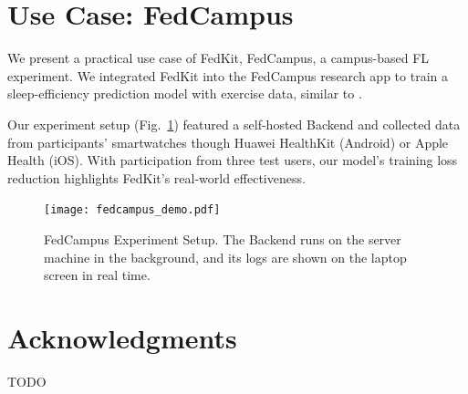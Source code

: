 \documentclass[letterpaper]{article} %
\begin{document}
\section{Use Case: FedCampus}

We present a practical use case of FedKit, FedCampus,
a campus-based FL experiment.
We integrated FedKit into the FedCampus research app to
train a sleep-efficiency prediction model with exercise data,
similar to \cite{khoa2022fedmcrnn}.

Our experiment setup (Fig.~\ref{fig:fedcampus}) featured a self-hosted Backend
and collected data from participants' smartwatches
though Huawei HealthKit (Android) or Apple Health (iOS).
With participation from three test users,
our model's training loss reduction highlights
FedKit's real-world effectiveness.

\begin{figure}
    \centering
    \texttt{[image: fedcampus\_demo.pdf]}
    \caption{FedCampus Experiment Setup.
        The Backend runs on the server machine in the background,
        and its logs are shown on the laptop screen in real time.}
    \label{fig:fedcampus}
\end{figure}

\appendix

\section*{Acknowledgments}
TODO

\bigskip


\end{document}
